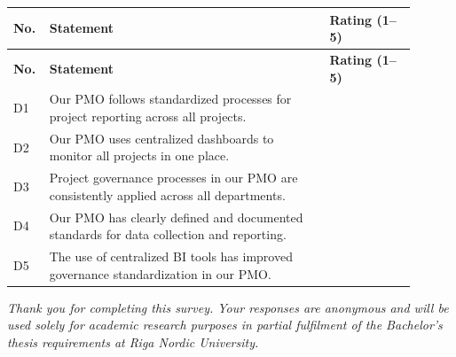 {\singlespacing
\begin{longtable}{@{} p{0.05\linewidth} p{0.65\linewidth} p{0.20\linewidth} @{}}
\toprule
\textbf{No.} & \textbf{Statement} & \textbf{Rating (1--5)}\\
\midrule
\endfirsthead
\toprule
\textbf{No.} & \textbf{Statement} & \textbf{Rating (1--5)}\\
\midrule
\endhead
\bottomrule
\endfoot
D1 & Our PMO follows standardized processes for project reporting across all
   projects.
   & \underline{\hspace{2cm}}\\[6pt]
D2 & Our PMO uses centralized dashboards to monitor all projects in one place.
   & \underline{\hspace{2cm}}\\[6pt]
D3 & Project governance processes in our PMO are consistently applied across
   all departments.
   & \underline{\hspace{2cm}}\\[6pt]
D4 & Our PMO has clearly defined and documented standards for data collection
   and reporting.
   & \underline{\hspace{2cm}}\\[6pt]
D5 & The use of centralized BI tools has improved governance standardization
   in our PMO.
   & \underline{\hspace{2cm}}\\
\end{longtable}
}

\bigskip
\noindent\textit{Thank you for completing this survey. Your responses are
anonymous and will be used solely for academic research purposes in partial
fulfilment of the Bachelor's thesis requirements at Riga Nordic University.}
